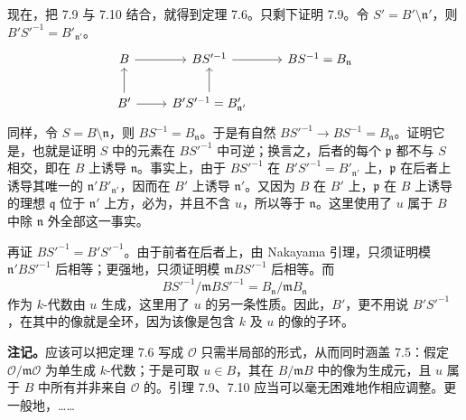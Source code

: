 现在，把 7.9 与 7.10 结合，就得到定理 7.6。只剩下证明 7.9。令 $S'=B'\setminus\mathfrak n'$，则 $B'S'^{-1}=B'_{\mathfrak n'}$。
\[
\begin{tikzcd}
 B\arrow[r] & BS'^{-1}\arrow[r] & BS^{-1}=B_{\mathfrak n}\\
 B'\arrow[u]\arrow[r] & B'S'^{-1}=B'_{\mathfrak n'}\arrow[u]
\end{tikzcd}
\]
同样，令 $S=B\setminus\mathfrak n$，则 $BS^{-1}=B_{\mathfrak n}$。于是有自然 $BS'^{-1}\to BS^{-1}=B_{\mathfrak n}$。证明它是，也就是证明 $S$ 中的元素在 $BS'^{-1}$ 中可逆；换言之，后者的每个 $\mathfrak p$ 都不与 $S$ 相交，即在 $B$ 上诱导 $\mathfrak n$。事实上，由于 $BS'^{-1}$ 在 $B'S'^{-1}=B'_{\mathfrak n'}$ 上，$\mathfrak p$ 在后者上诱导其唯一的 $\mathfrak n'B'_{\mathfrak n'}$，因而在 $B'$ 上诱导 $\mathfrak n'$。又因为 $B$ 在 $B'$ 上，$\mathfrak p$ 在 $B$ 上诱导的理想 $\mathfrak q$ 位于 $\mathfrak n'$ 上方，必为，并且不含 $u$，所以等于 $\mathfrak n$。这里使用了 $u$ 属于 $B$ 中除 $\mathfrak n$ 外全部这一事实。

再证 $BS'^{-1}=B'S'^{-1}$。由于前者在后者上，由 Nakayama 引理，只须证明模 $\mathfrak n'BS'^{-1}$ 后相等；更强地，只须证明模 $\mathfrak m BS'^{-1}$ 后相等。而
\[
 BS'^{-1}/\mathfrak m BS'^{-1}
 =B_{\mathfrak n}/\mathfrak m B_{\mathfrak n}
\]
作为 $k$-代数由 $u$ 生成，这里用了 $u$ 的另一条性质。因此，$B'$，更不用说 $B'S'^{-1}$，在其中的像就是全环，因为该像是包含 $k$ 及 $u$ 的像的子环。

\textbf{注记。}应该可以把定理 7.6 写成 $\mathcal O$ 只需半局部的形式，从而同时涵盖 7.5：假定 $\mathcal O/\mathfrak m\mathcal O$ 为单生成 $k$-代数；于是可取 $u\in B$，其在 $B/\mathfrak m B$ 中的像为生成元，且 $u$ 属于 $B$ 中所有并非来自 $\mathcal O$ 的。引理 7.9、7.10 应当可以毫无困难地作相应调整。更一般地，……

